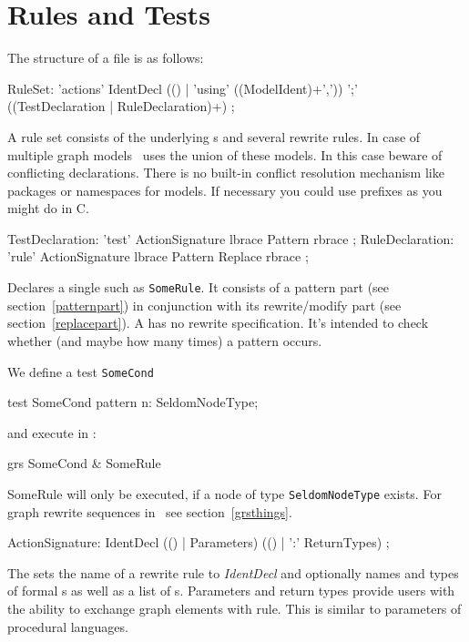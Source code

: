 \section{Rules and Tests}
\label{ruledecls}
The structure of a  file is as follows:
\begin{rail}
  RuleSet: 'actions' IdentDecl (() | 'using' ((ModelIdent)+',')) ';' \\ ((TestDeclaration | RuleDeclaration)+) ;
\end{rail}
A rule set consists of the underlying s and several rewrite rules. In case of multiple graph models \GrG\ uses the union of these models. In this case beware of conflicting declarations. There is no built-in conflict resolution mechanism like packages or namespaces for models. If necessary you could use prefixes as you might do in C.

\begin{rail}
  TestDeclaration: 'test' ActionSignature lbrace Pattern rbrace ;
  RuleDeclaration: 'rule' ActionSignature lbrace Pattern Replace rbrace ;
\end{rail}
Declares a single  such as \texttt{SomeRule}. It consists of a pattern part (see section~\ref{patternpart}) in conjunction with its rewrite/modify part (see section~\ref{replacepart}). A  has no rewrite specification. It's intended to check whether (and maybe how many times) a pattern occurs.
\begin{example}
We define a test \texttt{SomeCond}
\begin{grgen}
test SomeCond {
  pattern {
    n: SeldomNodeType;
  }
}
\end{grgen}
and execute in \GrShell:
\begin{grshell}
  grs SomeCond & SomeRule
\end{grshell}
SomeRule will only be executed, if a node of type \texttt{SeldomNodeType} exists. For graph rewrite sequences in \GrShell\ see section~\ref{grsthings}.
\end{example}

\begin{rail}  
  ActionSignature: IdentDecl (() | Parameters) (() | ':' ReturnTypes) ;
\end{rail}
The  sets the name of a rewrite rule to \emph{IdentDecl} and optionally names and types of formal s as well as a list of s. Parameters and return types provide users with the ability to exchange graph elements with rule. This is similar to parameters of procedural languages.

